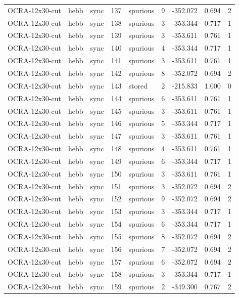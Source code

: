 \begin{tabular}{lllrlrrrr}
OCRA-12x30-cut & hebb & sync & 137 & spurious & 9 & -352.072 & 0.694 & 2 \\
OCRA-12x30-cut & hebb & sync & 138 & spurious & 3 & -353.344 & 0.717 & 1 \\
OCRA-12x30-cut & hebb & sync & 139 & spurious & 3 & -353.611 & 0.761 & 1 \\
OCRA-12x30-cut & hebb & sync & 140 & spurious & 4 & -353.344 & 0.717 & 1 \\
OCRA-12x30-cut & hebb & sync & 141 & spurious & 3 & -353.611 & 0.761 & 1 \\
OCRA-12x30-cut & hebb & sync & 142 & spurious & 8 & -352.072 & 0.694 & 2 \\
OCRA-12x30-cut & hebb & sync & 143 & stored & 2 & -215.833 & 1.000 & 0 \\
OCRA-12x30-cut & hebb & sync & 144 & spurious & 6 & -353.611 & 0.761 & 1 \\
OCRA-12x30-cut & hebb & sync & 145 & spurious & 3 & -353.611 & 0.761 & 1 \\
OCRA-12x30-cut & hebb & sync & 146 & spurious & 5 & -353.344 & 0.717 & 1 \\
OCRA-12x30-cut & hebb & sync & 147 & spurious & 3 & -353.611 & 0.761 & 1 \\
OCRA-12x30-cut & hebb & sync & 148 & spurious & 4 & -353.611 & 0.761 & 1 \\
OCRA-12x30-cut & hebb & sync & 149 & spurious & 6 & -353.344 & 0.717 & 1 \\
OCRA-12x30-cut & hebb & sync & 150 & spurious & 3 & -353.611 & 0.761 & 1 \\
OCRA-12x30-cut & hebb & sync & 151 & spurious & 3 & -352.072 & 0.694 & 2 \\
OCRA-12x30-cut & hebb & sync & 152 & spurious & 9 & -352.072 & 0.694 & 2 \\
OCRA-12x30-cut & hebb & sync & 153 & spurious & 3 & -353.344 & 0.717 & 1 \\
OCRA-12x30-cut & hebb & sync & 154 & spurious & 6 & -353.344 & 0.717 & 1 \\
OCRA-12x30-cut & hebb & sync & 155 & spurious & 8 & -352.072 & 0.694 & 2 \\
OCRA-12x30-cut & hebb & sync & 156 & spurious & 7 & -352.072 & 0.694 & 2 \\
OCRA-12x30-cut & hebb & sync & 157 & spurious & 6 & -352.072 & 0.694 & 2 \\
OCRA-12x30-cut & hebb & sync & 158 & spurious & 3 & -353.344 & 0.717 & 1 \\
OCRA-12x30-cut & hebb & sync & 159 & spurious & 2 & -349.300 & 0.767 & 2 \\

\end{tabular}
